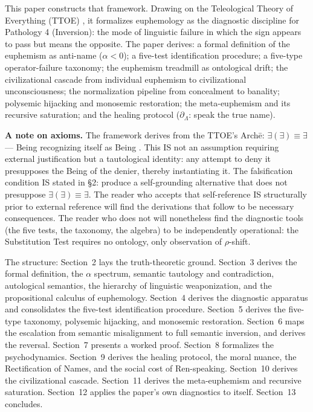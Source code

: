 \documentclass[11pt, oneside]{article}
\theoremstyle{definition}
\begin{document}
This paper constructs that framework. Drawing on the Teleological Theory of Everything (TTOE) \cite{codex1, codex2, codex3}, it formalizes euphemology as the diagnostic discipline for Pathology 4 (Inversion): the mode of linguistic failure in which the sign appears to pass but means the opposite. The paper derives: a formal definition of the euphemism as anti-name ($\alpha < 0$); a five-test identification procedure; a five-type operator-failure taxonomy; the euphemism treadmill as ontological drift; the civilizational cascade from individual euphemism to civilizational unconsciousness; the normalization pipeline from concealment to banality; polysemic hijacking and monosemic restoration; the meta-euphemism and its recursive saturation; and the healing protocol ($\partial_\Lambda$: speak the true name).

\textbf{A note on axioms.} The framework derives from the TTOE's Arch\={e}: $\exists(\exists) \equiv \exists$ --- Being recognizing itself as Being \cite{codex1}. This IS not an assumption requiring external justification but a tautological identity: any attempt to deny it presupposes the Being of the denier, thereby instantiating it. The falsification condition IS stated in \S2: produce a self-grounding alternative that does not presuppose $\exists(\exists) \equiv \exists$. The reader who accepts that self-reference IS structurally prior to external reference will find the derivations that follow to be necessary consequences. The reader who does not will nonetheless find the diagnostic tools (the five tests, the taxonomy, the algebra) to be independently operational: the Substitution Test requires no ontology, only observation of $\rho$-shift.

The structure: Section~2 lays the truth-theoretic ground. Section~3 derives the formal definition, the $\alpha$ spectrum, semantic tautology and contradiction, autological semantics, the hierarchy of linguistic weaponization, and the propositional calculus of euphemology. Section~4 derives the diagnostic apparatus and consolidates the five-test identification procedure. Section~5 derives the five-type taxonomy, polysemic hijacking, and monosemic restoration. Section~6 maps the escalation from semantic misalignment to full semantic inversion, and derives the reversal. Section~7 presents a worked proof. Section~8 formalizes the psychodynamics. Section~9 derives the healing protocol, the moral nuance, the Rectification of Names, and the social cost of Ren-speaking. Section~10 derives the civilizational cascade. Section~11 derives the meta-euphemism and recursive saturation. Section~12 applies the paper's own diagnostics to itself. Section~13 concludes.
\end{document}
